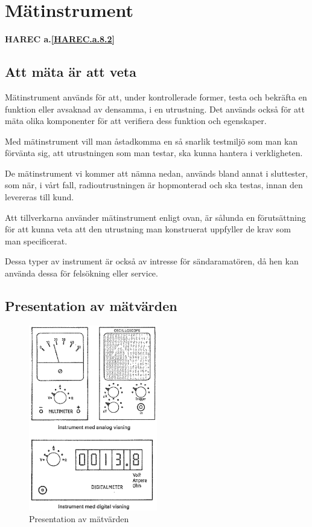 \section{Mätinstrument}
\textbf{
  HAREC a.\ref{HAREC.a.8.2}\label{myHAREC.a.8.2}
}

\subsection{Att mäta är att veta}

Mätinstrument används för att, under kontrollerade former, testa och bekräfta
en funktion eller avsaknad av densamma, i en utrustning.
Det används också för att mäta olika komponenter för att verifiera dess
funktion och egenskaper.

Med mätinstrument vill man åstadkomma en så snarlik testmiljö som man kan
förvänta sig, att utrustningen som man testar, ska kunna hantera i
verkligheten.

De mätinstrument vi kommer att nämna nedan, används bland annat i sluttester,
som när, i vårt fall, radioutrustningen är hopmonterad och ska testas, innan den
levereras till kund.

Att tillverkarna använder mätinstrument enligt ovan, är sålunda en förutsättning
för att kunna veta att den utrustning man konstruerat uppfyller de krav som man
specificerat.

Dessa typer av instrument är också av intresse för sändaramatören, då hen kan
använda dessa för felsökning eller service.

\subsection{Presentation av mätvärden}

\begin{figure}
  \includegraphics[width=0.5\textwidth]{images/cropped_pdfs/bild_2_8-02.pdf}
  \caption{Presentation av mätvärden}
  \label{fig:bildII8-2}
\end{figure}

